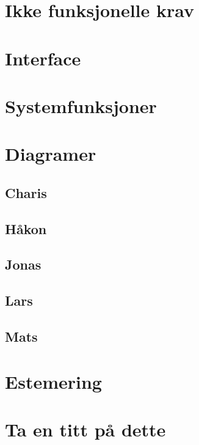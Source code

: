 \documentclass[12pt]{article}
\begin{document}
\section{Ikke funksjonelle krav}

\section{Interface}

\section{Systemfunksjoner}


\section{Diagramer}

    \subsection{Charis}

    \subsection{Håkon}

    \subsection{Jonas}

    \subsection{Lars}

    \subsection{Mats}

\section{Estemering}

\section{Ta en titt på dette}
\end{document}

